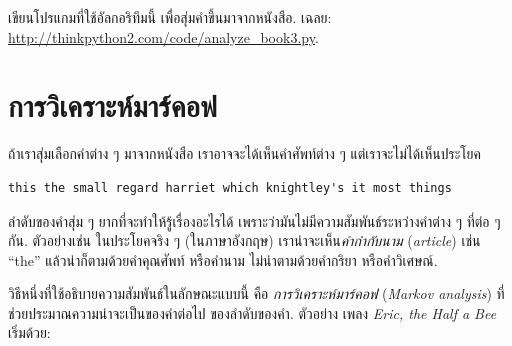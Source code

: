 \begin{exercise}
\label{randhist}


เขียนโปรแกมที่ใช้อัลกอริทึมนี้ เพื่อสุ่มคำขึ้นมาจากหนังสือ.  
เฉลย:
\url{http://thinkpython2.com/code/analyze_book3.py}.

\end{exercise}



\section{การวิเคราะห์มาร์คอฟ}
\label{markov}


ถ้าเราสุ่มเลือกคำต่าง ๆ มาจากหนังสือ
เราอาจจะได้เห็นคำศัพท์ต่าง ๆ
แต่เราจะไม่ได้เห็นประโยค

\begin{verbatim}
this the small regard harriet which knightley's it most things
\end{verbatim}
%
%
ลำดับของคำสุ่ม ๆ ยากที่จะทำให้รู้เรื่องอะไรได้
เพราะว่ามันไม่มีความสัมพันธ์ระหว่างคำต่าง ๆ ที่ต่อ ๆ กัน.
ตัวอย่างเช่น ในประโยคจริง ๆ (ในภาษาอังกฤษ)
เราน่าจะเห็น\textit{คำกำกับนาม} (\textit{article}) เช่น ``the''
แล้วน่าก็ตามด้วยคำคุณศัพท์ หรือคำนาม
ไม่น่าตามด้วยคำกริยา หรือคำวิเศษณ์.

  
วิธีหนึ่งที่ใช้อธิบายความสัมพันธ์ในลักษณะแบบนี้ คือ \textit{การวิเคราะห์มาร์คอฟ} (\textit{Markov analysis})
ที่ช่วยประมาณความน่าจะเป็นของคำต่อไป ของลำดับของคำ.
ตัวอย่าง เพลง \textit{Eric, the Half a Bee} เริ่มด้วย:


